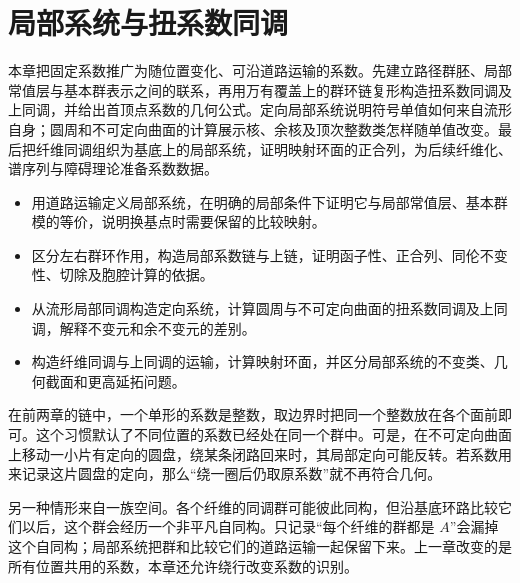 
% 
% 

\chapter{局部系统与扭系数同调}
\label{g2:ch:05}

\begin{chapterabstract}
	本章把固定系数推广为随位置变化、可沿道路运输的系数。先建立路径群胚、局部常值层与基本群表示之间的联系，再用万有覆盖上的群环链复形构造扭系数同调及上同调，并给出首顶点系数的几何公式。定向局部系统说明符号单值如何来自流形自身；圆周和不可定向曲面的计算展示核、余核及顶次整数类怎样随单值改变。最后把纤维同调组织为基底上的局部系统，证明映射环面的正合列，为后续纤维化、谱序列与障碍理论准备系数数据。
\end{chapterabstract}

\begin{learninggoals}
	\begin{itemize}
		\item 用道路运输定义局部系统，在明确的局部条件下证明它与局部常值层、基本群模的等价，说明换基点时需要保留的比较映射。
		\item 区分左右群环作用，构造局部系数链与上链，证明函子性、正合列、同伦不变性、切除及胞腔计算的依据。
		\item 从流形局部同调构造定向系统，计算圆周与不可定向曲面的扭系数同调及上同调，解释不变元和余不变元的差别。
		\item 构造纤维同调与上同调的运输，计算映射环面，并区分局部系统的不变类、几何截面和更高延拓问题。
	\end{itemize}
\end{learninggoals}

在前两章的链中，一个单形的系数是整数，取边界时把同一个整数放在各个面前即可。这个习惯默认了不同位置的系数已经处在同一个群中。可是，在不可定向曲面上移动一小片有定向的圆盘，绕某条闭路回来时，其局部定向可能反转。若系数用来记录这片圆盘的定向，那么“绕一圈后仍取原系数”就不再符合几何。

\ProseParagraphBreak

另一种情形来自一族空间。各个纤维的同调群可能彼此同构，但沿基底环路比较它们以后，这个群会经历一个非平凡自同构。只记录“每个纤维的群都是 \(A\)”会漏掉这个自同构；局部系统把群和比较它们的道路运输一起保留下来。上一章改变的是所有位置共用的系数，本章还允许绕行改变系数的识别。

